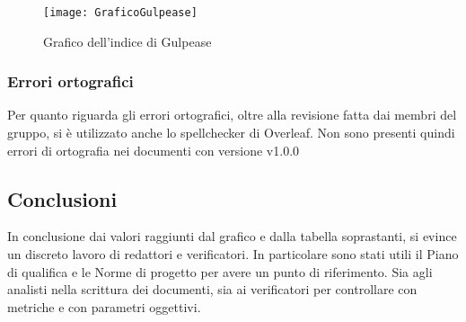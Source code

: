 \newpage
\begin{figure}[htp]
    \centering
    \texttt{[image: GraficoGulpease]}
    \caption{Grafico dell'indice di Gulpease}
    \label{fig:img-valori-gulpease}
\end{figure}


\subsubsection{Errori ortografici}

Per quanto riguarda gli errori ortografici, oltre alla revisione fatta dai membri del gruppo, si è utilizzato anche lo spellchecker di Overleaf. Non sono presenti quindi errori di ortografia nei documenti con versione v1.0.0


\subsection{Conclusioni}

In conclusione dai valori raggiunti dal grafico e dalla tabella soprastanti, si evince un discreto lavoro di redattori e verificatori.
In particolare sono stati utili il Piano di qualifica e le Norme di progetto per avere un punto di riferimento. Sia agli analisti nella scrittura dei documenti, sia ai verificatori per controllare con metriche e con parametri oggettivi.